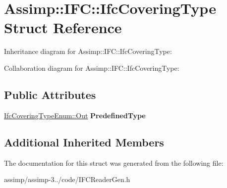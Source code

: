 \hypertarget{struct_assimp_1_1_i_f_c_1_1_ifc_covering_type}{\section{Assimp\+:\+:I\+F\+C\+:\+:Ifc\+Covering\+Type Struct Reference}
\label{struct_assimp_1_1_i_f_c_1_1_ifc_covering_type}
}


Inheritance diagram for Assimp\+:\+:I\+F\+C\+:\+:Ifc\+Covering\+Type\+:


Collaboration diagram for Assimp\+:\+:I\+F\+C\+:\+:Ifc\+Covering\+Type\+:
\subsection*{Public Attributes}
\begin{DoxyCompactItemize}
\item 
\hypertarget{struct_assimp_1_1_i_f_c_1_1_ifc_covering_type_a64597153421e1b4987e2deedc6c47262}{\hyperlink{classboost_1_1shared__ptr}{Ifc\+Covering\+Type\+Enum\+::\+Out} {\bfseries Predefined\+Type}}\label{struct_assimp_1_1_i_f_c_1_1_ifc_covering_type_a64597153421e1b4987e2deedc6c47262}

\end{DoxyCompactItemize}
\subsection*{Additional Inherited Members}


The documentation for this struct was generated from the following file\+:\begin{DoxyCompactItemize}
\item 
assimp/assimp-\/3../code/I\+F\+C\+Reader\+Gen.\+h\end{DoxyCompactItemize}
